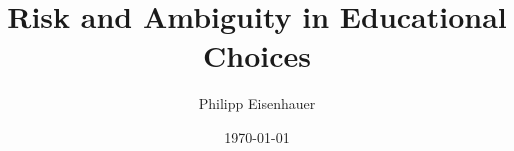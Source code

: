 \title{Risk and Ambiguity in Educational Choices}
\author{Philipp Eisenhauer}

\date{\today}

\let\otp\titlepage
